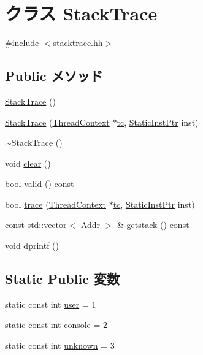 \hypertarget{classPowerISA_1_1StackTrace}{
\section{クラス StackTrace}
\label{classPowerISA_1_1StackTrace}
}


{\ttfamily \#include $<$stacktrace.hh$>$}\subsection*{Public メソッド}
\begin{DoxyCompactItemize}
\item 
\hyperlink{classPowerISA_1_1StackTrace_a5a9b2e3bba2262e73b20f87325efd063}{StackTrace} ()
\item 
\hyperlink{classPowerISA_1_1StackTrace_a7c751415d8c87372fc7d24513309cf1b}{StackTrace} (\hyperlink{classThreadContext}{ThreadContext} $\ast$\hyperlink{classPowerISA_1_1StackTrace_a4455a4759e69e5ebe68ae7298cbcc37d}{tc}, \hyperlink{classRefCountingPtr}{StaticInstPtr} inst)
\item 
\hyperlink{classPowerISA_1_1StackTrace_adec953886bb73db4f2ec91ed12810135}{$\sim$StackTrace} ()
\item 
void \hyperlink{classPowerISA_1_1StackTrace_ac8bb3912a3ce86b15842e79d0b421204}{clear} ()
\item 
bool \hyperlink{classPowerISA_1_1StackTrace_a8d985300b138b6c5556ab17ed4df3b38}{valid} () const 
\item 
bool \hyperlink{classPowerISA_1_1StackTrace_aabb136846a5e22007e44db846652ddd5}{trace} (\hyperlink{classThreadContext}{ThreadContext} $\ast$\hyperlink{classPowerISA_1_1StackTrace_a4455a4759e69e5ebe68ae7298cbcc37d}{tc}, \hyperlink{classRefCountingPtr}{StaticInstPtr} inst)
\item 
const \hyperlink{classstd_1_1vector}{std::vector}$<$ \hyperlink{base_2types_8hh_af1bb03d6a4ee096394a6749f0a169232}{Addr} $>$ \& \hyperlink{classPowerISA_1_1StackTrace_aceb93ba31a3756aca859b4643efeeb46}{getstack} () const 
\item 
void \hyperlink{classPowerISA_1_1StackTrace_a70fdc8802b54b4244889a2d3553405d5}{dprintf} ()
\end{DoxyCompactItemize}
\subsection*{Static Public 変数}
\begin{DoxyCompactItemize}
\item 
static const int \hyperlink{classPowerISA_1_1StackTrace_a80f5e5d52e325fee3fb197c8a15ff3b9}{user} = 1
\item 
static const int \hyperlink{classPowerISA_1_1StackTrace_ace24bfe6928bff7f701824622aa9b36e}{console} = 2
\item 
static const int \hyperlink{classPowerISA_1_1StackTrace_a204dd651615bf73491349b6403571f10}{unknown} = 3
\end{DoxyCompactItemize}
